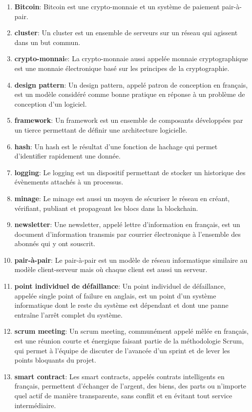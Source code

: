 \documentclass{tnreport}
\begin{document}
\begin{enumerate}
	\item \textbf{Bitcoin}: Bitcoin est une crypto-monnaie et un système de paiement pair-à-pair.
	\item \textbf{cluster}: Un cluster est un ensemble de serveurs sur un réseau qui agissent dans un but commun.
	\item \textbf{crypto-monnai}e: La crypto-monnaie aussi appelée monnaie cryptographique est une monnaie électronique basé sur les principes de la cryptographie.
	\item \textbf{design pattern}: Un design pattern, appelé patron de conception en français, est un modèle considéré comme bonne pratique en réponse à un problème de conception d'un logiciel.
	\item \textbf{framework}: Un framework est un ensemble de composants développées par un tierce permettant de définir une architecture logicielle.
	\item \textbf{hash}: Un hash est le résultat d'une fonction de hachage qui permet d'identifier rapidement une donnée.
	\item \textbf{logging}: Le logging est un dispositif permettant de stocker un historique des évènements attachés à un processus.
	\item \textbf{minage}: Le minage est aussi un moyen de sécuriser le réseau en créant, vérifiant, publiant et propageant les blocs dans la blockchain.
	\item \textbf{newsletter}: Une newsletter, appelé lettre d'information en français, est un document d'information transmis par courrier électronique à l'ensemble des abonnés qui y ont souscrit.
	\item \textbf{pair-à-pair}: Le pair-à-pair est un modèle de réseau informatique similaire au modèle client-serveur mais où chaque client est aussi un serveur.
	\item \textbf{point individuel de défaillance}: Un point individuel de défaillance, appelée single point of failure en anglais, est un point d'un système informatique dont le reste du système est dépendant et dont une panne entraîne l'arrêt complet du système.
	\item \textbf{scrum meeting}: Un scrum meeting, communément appelé mêlée en français, est une réunion courte et énergique faisant partie de la méthodologie Scrum, qui permet à l'équipe de discuter de l'avancée d'un sprint et de lever les points bloquants du projet.
	\item \textbf{smart contract}: Les smart contracts, appelés contrats intelligents en français, permettent d'échanger de l'argent, des biens, des parts ou n'importe quel actif de manière transparente, sans conflit et en évitant tout service intermédiaire.

\end{enumerate}
\end{document}
